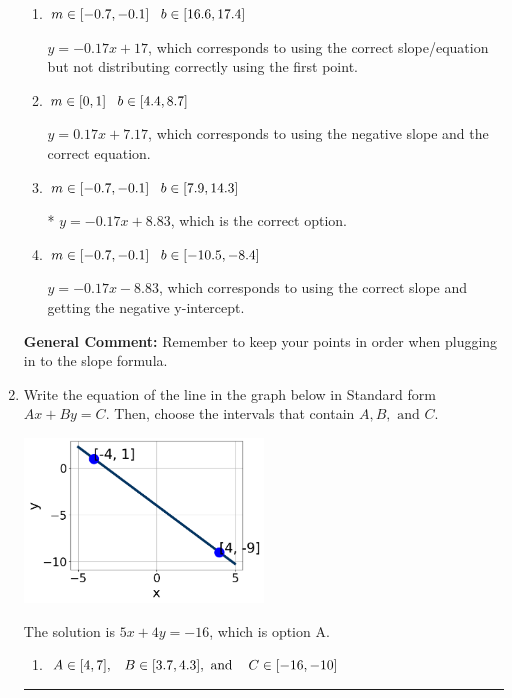 \documentclass{extbook}[14pt]
\newcommand{\litem}[1]{\item #1

\rule{\textwidth}{0.4pt}}
\begin{document}
\begin{enumerate}
{\begin{enumerate}[label=\Alph*.]
 $y = -0.17x + 3$, which corresponds to using the correct slope/equation but not distributing correctly using the second point.
\item \( m \in [-0.7, -0.1] \hspace*{3mm} b \in [16.6, 17.4] \)

 $y = -0.17x + 17$, which corresponds to using the correct slope/equation but not distributing correctly using the first point.
\item \( m \in [0, 1] \hspace*{3mm} b \in [4.4, 8.7] \)

 $y = 0.17x + 7.17$, which corresponds to using the negative slope and the correct equation.
\item \( m \in [-0.7, -0.1] \hspace*{3mm} b \in [7.9, 14.3] \)

* $y = -0.17x + 8.83$, which is the correct option.
\item \( m \in [-0.7, -0.1] \hspace*{3mm} b \in [-10.5, -8.4] \)

 $y = -0.17x -8.83$, which corresponds to using the correct slope and getting the negative y-intercept.
\end{enumerate}

\textbf{General Comment:} Remember to keep your points in order when plugging in to the slope formula.
}
\litem{
Write the equation of the line in the graph below in Standard form $Ax+By=C$. Then, choose the intervals that contain $A, B, \text{ and } C$.

\begin{center}
    \includegraphics[width=0.5\textwidth]{../Figures/linearGraphToStandardCopyC.png}
\end{center}


The solution is \( 5x + 4y = -16 \), which is option A.\begin{enumerate}[label=\Alph*.]
\item \( A \in [4, 7], \hspace{3mm} B \in [3.7, 4.3], \text{ and } \hspace{3mm} C \in [-16, -10] \)


\end{enumerate}}
\end{enumerate}
\end{document}
